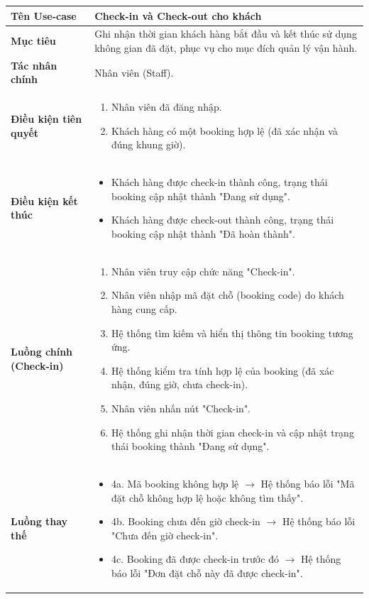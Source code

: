 \begin{table}[H]
\centering
\renewcommand{\arraystretch}{1.3}
\begin{tabular}{|p{4cm}|p{10cm}|}
\hline
\textbf{Tên Use-case} 
& Check-in và Check-out cho khách \\ 
\hline

\textbf{Mục tiêu} 
& Ghi nhận thời gian khách hàng bắt đầu và kết thúc sử dụng không gian đã đặt, phục vụ cho mục đích quản lý vận hành. \\ 
\hline

\textbf{Tác nhân chính} 
& Nhân viên (Staff). \\ 
\hline

\textbf{Điều kiện tiên quyết} 
&
\begin{enumerate}
\item Nhân viên đã đăng nhập.
\item Khách hàng có một booking hợp lệ (đã xác nhận và đúng khung giờ). 
\end{enumerate} \\ 
\hline

\textbf{Điều kiện kết thúc} 
& 
\begin{itemize}
\item Khách hàng được check-in thành công, trạng thái booking cập nhật thành "Đang sử dụng".
\item Khách hàng được check-out thành công, trạng thái booking cập nhật thành "Đã hoàn thành".
\end{itemize} \\ 
\hline

\textbf{Luồng chính (Check-in)} 
& 
\begin{enumerate}
    \item Nhân viên truy cập chức năng "Check-in".
    \item Nhân viên nhập mã đặt chỗ (booking code) do khách hàng cung cấp.
    \item Hệ thống tìm kiếm và hiển thị thông tin booking tương ứng.
    \item Hệ thống kiểm tra tính hợp lệ của booking (đã xác nhận, đúng giờ, chưa check-in).
    \item Nhân viên nhấn nút "Check-in".
    \item Hệ thống ghi nhận thời gian check-in và cập nhật trạng thái booking thành "Đang sử dụng".
\end{enumerate} \\ 
\hline

\textbf{Luồng thay thế} 
& 
\begin{itemize}
    \item 4a. Mã booking không hợp lệ $\rightarrow$ Hệ thống báo lỗi "Mã đặt chỗ không hợp lệ hoặc không tìm thấy".
    \item 4b. Booking chưa đến giờ check-in $\rightarrow$ Hệ thống báo lỗi "Chưa đến giờ check-in".
    \item 4c. Booking đã được check-in trước đó $\rightarrow$ Hệ thống báo lỗi "Đơn đặt chỗ này đã được check-in".
\end{itemize} \\ 
\hline


\end{tabular}
\end{table}
